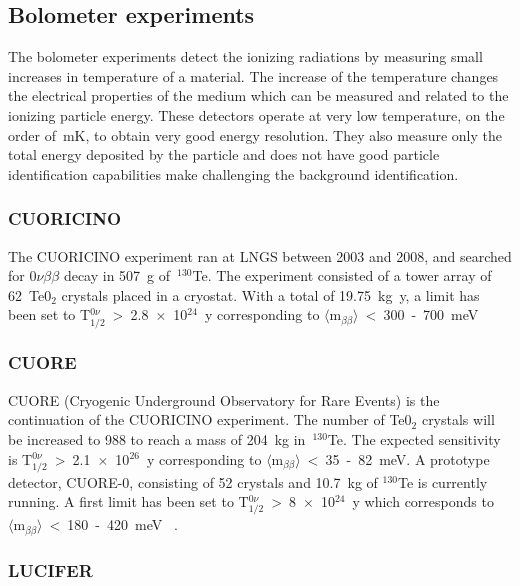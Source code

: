 \documentclass[main.tex]{subfiles}
\begin{document}
\subsection{Bolometer experiments}


\NI The bolometer experiments detect the ionizing radiations by measuring small increases in temperature of a material. The increase of the temperature changes the electrical properties of the medium which can be measured and related to the ionizing particle energy. These detectors operate at very low temperature, on the order of~mK, to obtain very good energy resolution. They also measure only the total energy deposited by the particle and does not have good particle identification capabilities make challenging the background identification.


\subsubsection{CUORICINO}


\NI The CUORICINO experiment ran at LNGS between 2003 and 2008, and searched for 0$\nu\beta\beta$ decay in 507~g of~$^{\text{130}}$Te. The experiment consisted of a tower array of 62~Te0$_\text{2}$ crystals placed in a cryostat. With a total of 19.75~kg~y, a limit has been set to T$_{\text{1/2}}^{0\nu}$~>~2.8~$\times$~10$^{\text{24}}$~y corresponding to $\langle \text{m}_{\beta\beta} \rangle$~<~300~-~700~meV~\cite{CUORICINO}


\subsubsection{CUORE}


\NI CUORE (Cryogenic Underground Observatory for Rare Events) is the continuation of the CUORICINO experiment. The number of Te0$_\text{2}$ crystals will be increased to 988 to reach a mass of 204~kg in~$^{\text{130}}$Te. The expected sensitivity is T$_{\text{1/2}}^{0\nu}$~>~2.1~$\times$~10$^{\text{26}}$~y corresponding to $\langle \text{m}_{\beta\beta} \rangle$~<~35~-~82~meV. A prototype detector, CUORE-0, consisting of 52 crystals and 10.7~kg of $^{\text{130}}$Te is currently running. A first limit has been set to T$_{\text{1/2}}^{0\nu}$~>~8~$\times$~10$^{\text{24}}$~y which corresponds to $\langle \text{m}_{\beta\beta} \rangle$~<~180~-~420~meV~\cite{CUORE} .


\subsubsection{LUCIFER}
\end{document}

